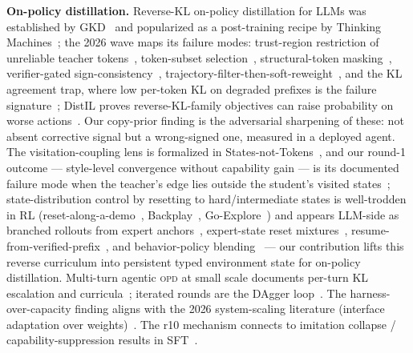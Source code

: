 \documentclass[11pt]{article}
\newcommand{\opd}{\textsc{opd}}
\begin{document}
\textbf{On-policy distillation.} Reverse-KL on-policy distillation for LLMs was established by
GKD~\cite{gkd} and popularized as a post-training recipe by Thinking Machines~\cite{tml}; the 2026 wave maps its failure modes: trust-region restriction of unreliable
teacher tokens~\cite{tropd}, token-subset selection~\cite{tip,teachability}, structural-token
masking~\cite{simplefixes,rocktokens}, verifier-gated sign-consistency~\cite{sgopd},
trajectory-filter-then-soft-reweight~\cite{fire}, and the KL agreement trap, where low per-token
KL on degraded prefixes is the failure signature~\cite{kat}; DistIL proves reverse-KL-family
objectives can raise probability on worse actions~\cite{distil}. Our copy-prior finding is the
adversarial sharpening of these: not absent corrective signal but a wrong-signed one, measured
in a deployed agent. The visitation-coupling lens is formalized in States-not-Tokens~\cite{snt},
and our round-1 outcome --- style-level convergence without capability gain --- is its documented
failure mode when the teacher's edge lies outside the student's visited states~\cite{rethinking};
state-distribution control by resetting to hard/intermediate states is well-trodden in RL
(reset-along-a-demo~\cite{salchen}, Backplay~\cite{backplay}, Go-Explore~\cite{goexplore}) and
appears LLM-side as branched rollouts from expert anchors~\cite{bread}, expert-state reset
mixtures~\cite{reset5050}, resume-from-verified-prefix~\cite{score}, and behavior-policy
blending~\cite{trb} --- our contribution lifts this reverse curriculum into persistent typed
environment state for on-policy distillation. Multi-turn agentic \opd{} at small scale documents per-turn KL
escalation and curricula~\cite{tcod}; iterated rounds are the DAgger loop~\cite{dagger,survey}.
The harness-over-capacity finding aligns with the 2026 system-scaling literature (interface
adaptation over weights)~\cite{lifeharness,systemscaling}. The r10 mechanism connects to imitation
collapse / capability-suppression results in SFT~\cite{gem}.
\end{document}
